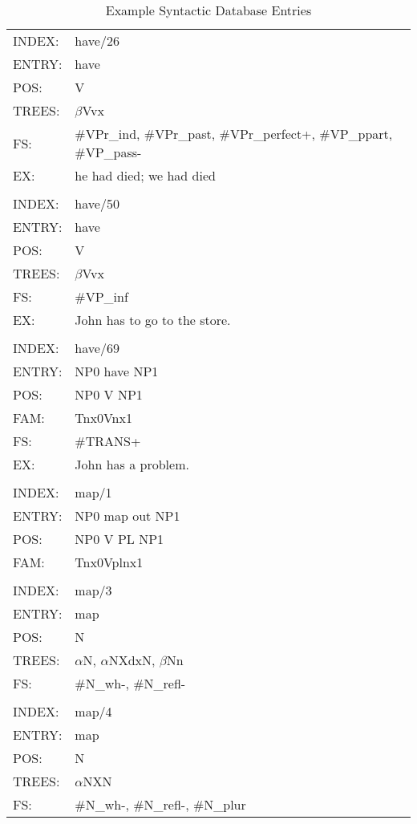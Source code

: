\begin{table}[ht]
\begin{tabular}{ll}

INDEX: & have/26 \\
ENTRY: & have \\
POS: & V \\
TREES:& $\beta$Vvx \\
FS:&\#VPr\_ind, \#VPr\_past, \#VPr\_perfect+, \#VP\_ppart, \#VP\_pass- \\
EX:&he had died; we had died \\
\\
INDEX: & have/50 \\
ENTRY:& have \\ 
POS:& V \\ 
TREES:& $\beta$Vvx \\
FS:&\#VP\_inf  \\ 
EX:&John has to go to the store. \\
\\
INDEX:&have/69\\
ENTRY:&NP0 have NP1\\
POS:&NP0 V NP1 \\
FAM: &Tnx0Vnx1 \\
FS:&\#TRANS+ \\
EX:&John has a problem. \\
\\
INDEX:&map/1 \\
ENTRY:&NP0 map out NP1 \\
POS:&NP0 V PL NP1 \\
FAM: &Tnx0Vplnx1 \\
\\
INDEX:& map/3 \\
ENTRY:& map \\
POS: & N \\
TREES: & $\alpha$N,  $\alpha$NXdxN, $\beta$Nn \\
FS: & \#N\_wh-, \#N\_refl- \\
\\
INDEX: & map/4 \\
ENTRY: & map \\
POS: & N \\
TREES: & $\alpha$NXN \\
FS: & \#N\_wh-, \#N\_refl-, \#N\_plur \\
\end{tabular}	
\caption{Example Syntactic Database Entries}
\label{syn-entries}
\end{table}

